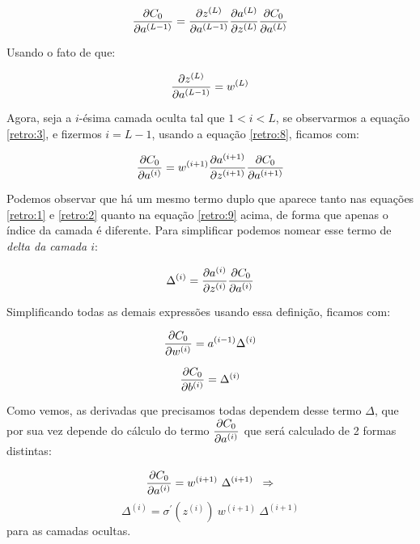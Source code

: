 \begin{equation}\label{retro:3}
\frac{\partial C_0}{\partial a^{(L-1)}} = \frac{\partial z^{(L)}}{\partial a^{(L-1)}} \frac{\partial a^{(L)}}{\partial z^{(L)}} \frac{\partial C_0}{\partial a^{(L)}}
\end{equation}

Usando o fato de que:

\begin{equation}\label{retro:8}
\frac{\partial z^{(L)}}{\partial a^{(L-1)}} = w^{(L)}
\end{equation}

Agora, seja a $i$-ésima camada oculta tal que $1 < i < L$, se observarmos a equação \ref{retro:3}, e fizermos $i = L-1$, usando a equação \ref{retro:8}, ficamos com:

\begin{equation}\label{retro:9}
\frac{\partial C_0}{\partial a^{(i)}} = w^{(i+1)} \frac{\partial a^{(i+1)}}{\partial z^{(i+1)}} \frac{\partial C_0}{\partial a^{(i+1)}}
\end{equation}

Podemos observar que há um mesmo termo duplo que aparece tanto nas equações \ref{retro:1} e \ref{retro:2} quanto na equação \ref{retro:9} acima, de forma que apenas o índice da camada é diferente. Para simplificar podemos nomear esse termo de \emph{delta da camada $i$}:

\begin{equation}\label{retro:12}
\Delta^{(i)} = \dfrac{\partial a^{(i)}}{\partial z^{(i)}} \dfrac{\partial C_0}{\partial a^{(i)}}
\end{equation}

Simplificando todas as demais expressões usando essa definição, ficamos com:

\begin{equation}\label{retro:13}
\frac{\partial C_0}{\partial w^{(i)}} = a^{(i-1)} \Delta^{(i)}
\end{equation}

\begin{equation}\label{retro:14}
\frac{\partial C_0}{\partial b^{(i)}} = \Delta^{(i)}
\end{equation}

Como vemos, as derivadas que precisamos todas dependem desse termo $\Delta$, que por sua vez depende do cálculo do termo $\dfrac{\partial C_0}{\partial a^{(i)}}$ que será calculado de 2 formas distintas:

\[ \dfrac{\partial C_0}{\partial a^{(i)}} = w^{(i+1)}~ \Delta^{(i+1)}  \;\;\Rightarrow \]
\begin{equation}\label{retro:15}
\Delta^{(i)} = \sigma^{'}(z^{(i)})~ w^{(i+1)}~ \Delta^{(i+1)}
\end{equation}
para as camadas ocultas.



